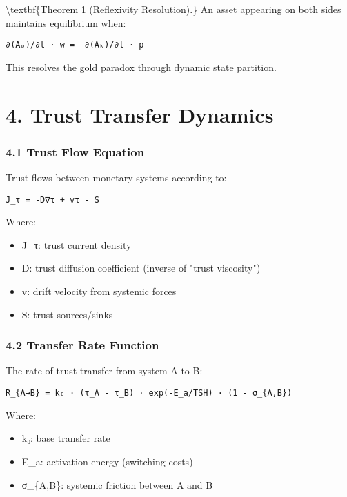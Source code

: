 \documentclass[11pt,oneside]{book}
\begin{document}
\textbackslash textbf\{Theorem 1 (Reflexivity Resolution).\} An asset appearing on both sides maintains equilibrium when:

\begin{verbatim}
∂(Aₚ)/∂t · w = -∂(Aₖ)/∂t · p
\end{verbatim}

This resolves the gold paradox through dynamic state partition.

\section{4. Trust Transfer Dynamics}

\subsubsection{4.1 Trust Flow Equation}

Trust flows between monetary systems according to:

\begin{verbatim}
J_τ = -D∇τ + vτ - S
\end{verbatim}

Where:
\begin{itemize}
\item J\_τ: trust current density
\item D: trust diffusion coefficient (inverse of "trust viscosity")
\item v: drift velocity from systemic forces
\item S: trust sources/sinks
\end{itemize}

\subsubsection{4.2 Transfer Rate Function}

The rate of trust transfer from system A to B:

\begin{verbatim}
R_{A→B} = k₀ · (τ_A - τ_B) · exp(-E_a/TSH) · (1 - σ_{A,B})
\end{verbatim}

Where:
\begin{itemize}
\item k₀: base transfer rate
\item E\_a: activation energy (switching costs)
\item σ\_\{A,B\}: systemic friction between A and B
\end{itemize}
\end{document}
